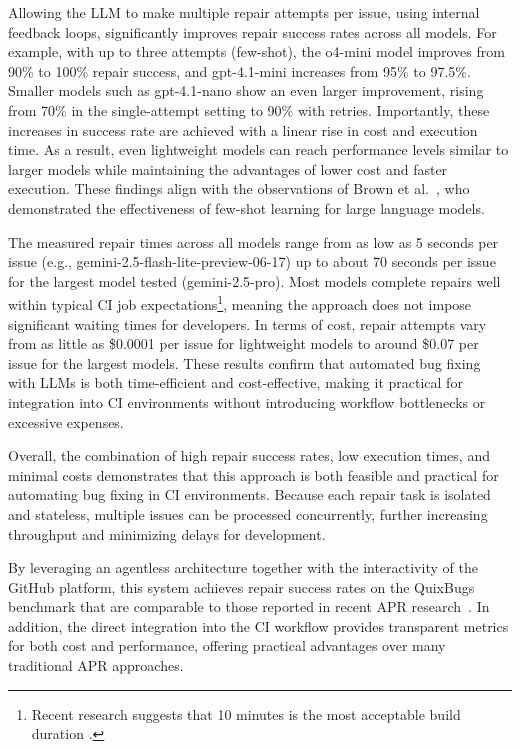 Allowing the \ac{LLM} to make multiple repair attempts per issue, using internal feedback loops, significantly improves repair success rates across all models. For example, with up to three attempts (few-shot), the o4-mini model improves from 90\% to 100\% repair success, and gpt-4.1-mini increases from 95\% to 97.5\%. Smaller models such as gpt-4.1-nano show an even larger improvement, rising from 70\% in the single-attempt setting to 90\% with retries. Importantly, these increases in success rate are achieved with a linear rise in cost and execution time. As a result, even lightweight models can reach performance levels similar to larger models while maintaining the advantages of lower cost and faster execution. These findings align with the observations of Brown et al.~\cite{brownLanguageModelsAre2020}, who demonstrated the effectiveness of few-shot learning for large language models.

The measured repair times across all models range from as low as 5 seconds per issue (e.g., gemini-2.5-flash-lite-preview-06-17) up to about 70 seconds per issue for the largest model tested (gemini-2.5-pro). Most models complete repairs well within typical CI job expectations\footnote{Recent research suggests that 10 minutes is the most acceptable build duration \cite{hiltonTradeoffsContinuousIntegration2017}.}, meaning the approach does not impose significant waiting times for developers. In terms of cost, repair attempts vary from as little as \$0.0001 per issue for lightweight models to around \$0.07 per issue for the largest models. These results confirm that automated bug fixing with \acp{LLM} is both time-efficient and cost-effective, making it practical for integration into \ac{CI} environments without introducing workflow bottlenecks or excessive expenses.

Overall, the combination of high repair success rates, low execution times, and minimal costs demonstrates that this approach is both feasible and practical for automating bug fixing in CI environments. Because each repair task is isolated and stateless, multiple issues can be processed concurrently, further increasing throughput and minimizing delays for development.

By leveraging an agentless architecture together with the interactivity of the GitHub platform, this system achieves repair success rates on the QuixBugs benchmark that are comparable to those reported in recent APR research~\cite{huCanGPTO1Kill2024, }. In addition, the direct integration into the CI workflow provides transparent metrics for both cost and performance, offering practical advantages over many traditional APR approaches.

